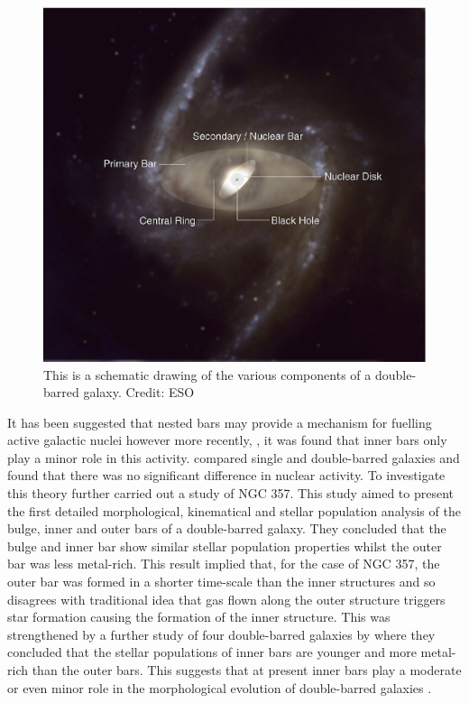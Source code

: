 \documentclass[a4paper,12pt]{article}
\begin{document}
\begin{figure}[H]
\centering
\includegraphics[width=.9\textwidth]{./eso0128d.eps}
\caption{This is a schematic drawing of the various components of a double-barred galaxy. Credit: ESO}
\label{fig:doublepic}
\end{figure}

It has been suggested that nested bars may provide a mechanism for fuelling active galactic nuclei \citep{shlosman} however more recently, \citep{erwin3}, it was found that inner bars only play a minor role in this 
activity. \cite{erwin1} compared single and double-barred galaxies and found that there was no significant difference in nuclear activity. To investigate this theory further \cite{lorenzo1} carried out a 
study of NGC 357. This study aimed to present the first detailed morphological, kinematical and stellar population analysis of the bulge, inner and outer bars of a double-barred galaxy. They concluded that
the bulge and inner bar show similar stellar population properties whilst the outer bar was less metal-rich. This result implied that, for the case of NGC 357, the outer bar was formed in a shorter time-scale than
the inner structures and so disagrees with traditional idea that gas flown along the outer structure triggers star formation causing the formation of the inner structure. This was strengthened by a further study of
four double-barred galaxies by \cite{lorenzo2} where they concluded that the stellar populations of inner bars are younger and more metal-rich than the outer bars. This suggests that at present inner bars play a
moderate or even minor role in the morphological evolution of double-barred galaxies \citep{lorenzo2}.
\end{document}
